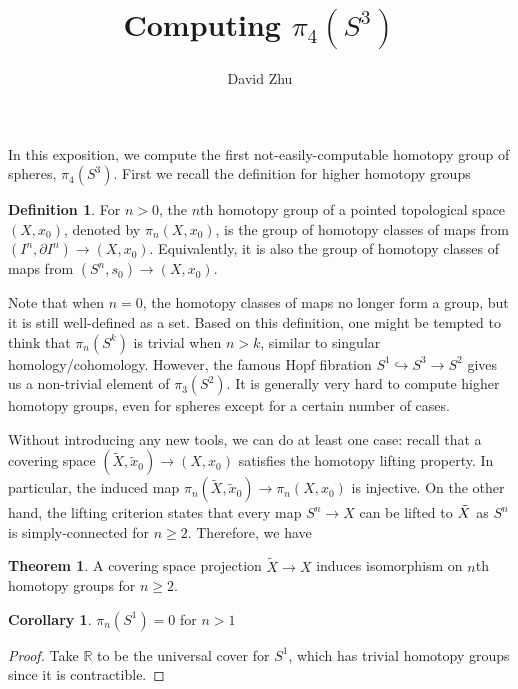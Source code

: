 \documentclass{article}
\title{Computing $\pi_4(S^3)$}
\author{David Zhu}
\theoremstyle{definition}
\newtheorem{theorem}{Theorem}[section]
\theoremstyle{definition}
\theoremstyle{definition}
\theoremstyle{definition}
\theoremstyle{definition}
\newtheorem{definition}{Definition}[section]
\theoremstyle{definition}
\newtheorem{corollary}{Corollary}[theorem]
\theoremstyle{definition}
\begin{document}
\maketitle


In this exposition, we compute the first not-easily-computable homotopy group of spheres, $\pi_4(S^3)$. First we recall the definition for higher homotopy groups

\begin{tcolorbox}[colback=purple!5!white,colframe=purple!75!black]
\begin{definition}
For $n>0$, the  $n$th homotopy group of a pointed topological space $(X,x_0)$, denoted by $\pi_n(X,x_0)$, is the group of homotopy classes of maps from $(I^n,\partial I^n)\to (X,x_0)$. Equivalently, it is also the group of homotopy classes of maps from $(S^n,s_0)\to (X,x_0)$. 
\end{definition}
\end{tcolorbox}
Note that when $n=0$, the homotopy classes of maps no longer form a group, but it is still well-defined as a set. Based on this definition, one might be tempted to think that $\pi_n(S^k)$ is trivial when $n>k$, similar to singular homology/cohomology. However, the famous Hopf fibration $S^1\hookrightarrow S^3\to S^2$ gives us a non-trivial element of $\pi_3(S^2)$. It is generally very hard to compute higher homotopy groups, even for spheres except for a certain number of cases.

Without introducing any new tools, we can do at least one case: recall that a covering space $(\tilde{X},\tilde{x}_0)\to (X,x_0)$ satisfies the homotopy lifting property. In particular, the induced map $\pi_n(\tilde{X},\tilde{x}_0)\to \pi_n(X,x_0)$ is injective. On the other hand, the lifting criterion states that every map $S^n\to X$ can be lifted to $\Tilde{X}$ as $S^n$ is simply-connected for $n\geq 2$. Therefore, we have

\begin{tcolorbox}[colback=red!5!white,colframe=red!30!white]
\begin{theorem}
A covering space projection $\tilde{X}\to X$ induces isomorphism on $n$th homotopy groups for $n\geq 2$.
\end{theorem}
\end{tcolorbox}

\begin{tcolorbox}[colback=green!5!white,colframe=green!30!white]
\begin{corollary}
    $\pi_n(S^1)=0$ for $n>1$
\end{corollary}
\end{tcolorbox}
\begin{proof}
    Take $\mathbb{R}$ to be the universal cover for $S^1$, which has trivial homotopy groups since it is contractible.
\end{proof}
\end{document}
